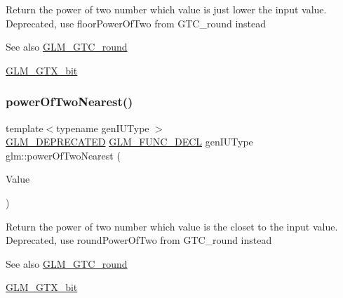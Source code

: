 Return the power of two number which value is just lower the input value. Deprecated, use floor\+Power\+Of\+Two from G\+T\+C\+\_\+round instead

\begin{DoxySeeAlso}{See also}
\mbox{\hyperlink{group__gtc__round}{G\+L\+M\+\_\+\+G\+T\+C\+\_\+round}} 

\mbox{\hyperlink{group__gtx__bit}{G\+L\+M\+\_\+\+G\+T\+X\+\_\+bit}} 
\end{DoxySeeAlso}
\mbox{\label{group__gtx__bit_ga5f65973a5d2ea38c719e6a663149ead9}} 
\subsubsection{\texorpdfstring{power\+Of\+Two\+Nearest()}{powerOfTwoNearest()}\hspace{0.1cm}{\footnotesize\ttfamily [1/2]}}
{\footnotesize\ttfamily template$<$typename gen\+I\+U\+Type $>$ \\
\mbox{\hyperlink{setup_8hpp_a8edfb48cdc249a3ee48406bf179023dc}{G\+L\+M\+\_\+\+D\+E\+P\+R\+E\+C\+A\+T\+ED}} \mbox{\hyperlink{setup_8hpp_ab2d052de21a70539923e9bcbf6e83a51}{G\+L\+M\+\_\+\+F\+U\+N\+C\+\_\+\+D\+E\+CL}} gen\+I\+U\+Type glm\+::power\+Of\+Two\+Nearest (\begin{DoxyParamCaption}\item[{gen\+I\+U\+Type}]{Value }\end{DoxyParamCaption})}

Return the power of two number which value is the closet to the input value. Deprecated, use round\+Power\+Of\+Two from G\+T\+C\+\_\+round instead

\begin{DoxySeeAlso}{See also}
\mbox{\hyperlink{group__gtc__round}{G\+L\+M\+\_\+\+G\+T\+C\+\_\+round}} 

\mbox{\hyperlink{group__gtx__bit}{G\+L\+M\+\_\+\+G\+T\+X\+\_\+bit}} 
\end{DoxySeeAlso}
\mbox{\label{group__gtx__bit_gac87e65d11e16c3d6b91c3bcfaef7da0b}} 
